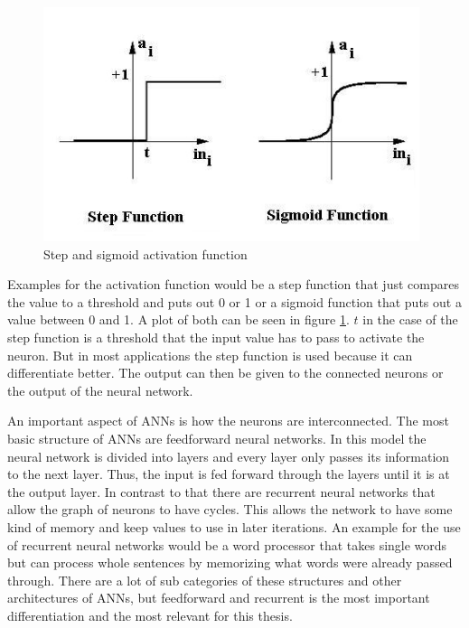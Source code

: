 \begin{figure}[ht]
	\centering
  \includegraphics[width=11cm]{figures/activation_functions}
	\caption[Step and sigmoid activation function]{Step and sigmoid activation function \protect\footnotemark}
	\label{activation_functions}
\end{figure}

Examples for the activation function would be a step function that just compares the value to a threshold and puts out 0 or 1 or a sigmoid function that puts out a value between 0 and 1. A plot of both can be seen in figure \ref{activation_functions}. $t$ in the case of the step function is a threshold that the input value has to pass to activate the neuron. But in most applications the step function is used because it can differentiate better. The output can then be given to the connected neurons or the output of the neural network.

An important aspect of ANNs is how the neurons are interconnected. The most basic structure of ANNs are feedforward neural networks. In this model the neural network is divided into layers and every layer only passes its information to the next layer. Thus, the input is fed forward through the layers until it is at the output layer. In contrast to that there are recurrent neural networks that allow the graph of neurons to have cycles. This allows the network to have some kind of memory and keep values to use in later iterations. An example for the use of recurrent neural networks would be a word processor that takes single words but can process whole sentences by memorizing what words were already passed through. There are a lot of sub categories of these structures and other architectures of ANNs, but feedforward and recurrent is the most important differentiation and the most relevant for this thesis.

